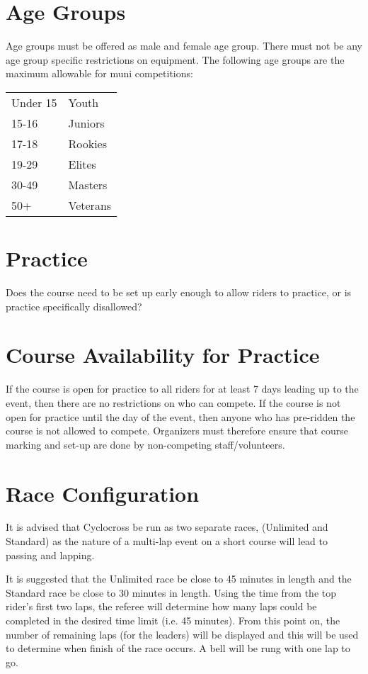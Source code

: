 \section{Age Groups}

Age groups must be offered as male and female age group.
There must not be any age group specific restrictions on equipment.
The following age groups are the maximum allowable for muni competitions:

\begin{tabular}{ l l}
Under 15 & Youth \\
15-16 & Juniors \\
17-18 & Rookies \\
19-29 & Elites \\
30-49 & Masters \\
50+ & Veterans \\
\end{tabular}

\section{Practice}

\begin{framed}
Does the course need to be set up early enough to allow riders to practice, or is practice specifically disallowed?
\end{framed}

\section{Course Availability for Practice}
If the course is open for practice to all riders for at least 7 days leading up to the event, then there are no restrictions on who can compete. 
If the course is not open for practice until the day of the event, then anyone who has pre-ridden the course is not allowed to compete. 
Organizers must therefore ensure that course marking and set-up are done by non-competing staff/volunteers.

\section{Race Configuration}

It is advised that Cyclocross be run as two separate races, (Unlimited and Standard) as the nature of a multi-lap event on a short course will lead to passing and lapping.

It is suggested that the Unlimited race be close to 45 minutes in length and the Standard race be close to 30 minutes in length.
Using the time from the top rider's first two laps, the referee will determine how many laps could be completed in the desired time limit (i.e. 45 minutes).
From this point on, the number of remaining laps (for the leaders) will be displayed and this will be used to determine when finish of the race occurs. A bell will be rung with one lap to go.

